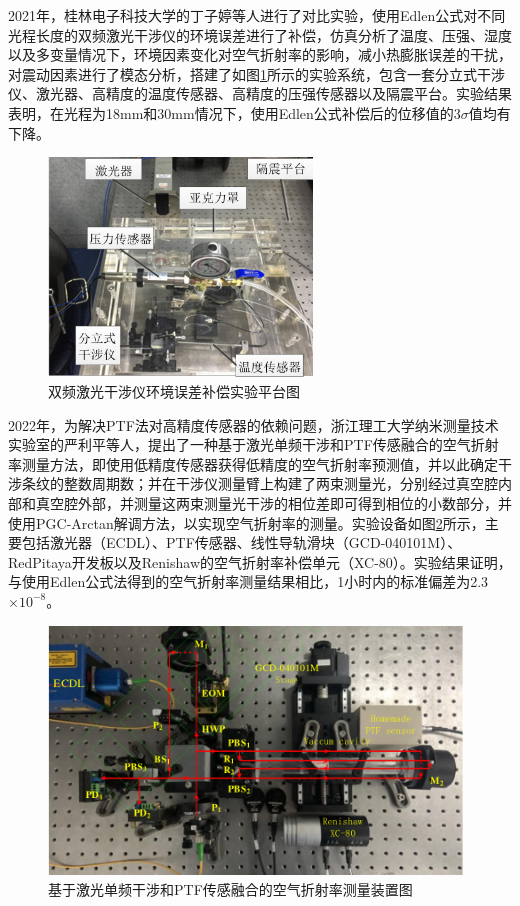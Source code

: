 2021年，桂林电子科技大学的丁子婷等人进行了对比实验，使用Edlen公式对不同光程长度的双频激光干涉仪的环境误差进行了补偿，仿真分析了温度、压强、湿度以及多变量情况下，环境因素变化对空气折射率的影响，减小热膨胀误差的干扰，对震动因素进行了模态分析，搭建了如图\ref{fig:双频激光干涉仪环境误差补偿实验平台图}所示的实验系统\cite{丁子婷双频激光干涉仪测量系统的环境误差研究}，包含一套分立式干涉仪、激光器、高精度的温度传感器、高精度的压强传感器以及隔震平台。实验结果表明，在光程为18mm和30mm情况下，使用Edlen公式补偿后的位移值的3$\sigma$值均有下降。
\begin{figure}[htb]
  \centering
  \includegraphics[width=7cm]{fig/1-fig/双频激光干涉仪环境误差补偿实验平台图.jpg}
  \caption{双频激光干涉仪环境误差补偿实验平台图}
  \label{fig:双频激光干涉仪环境误差补偿实验平台图}
\end{figure}

2022年，为解决PTF法对高精度传感器的依赖问题，浙江理工大学纳米测量技术实验室的严利平等人，提出了一种基于激光单频干涉和PTF传感融合的空气折射率测量方法，即使用低精度传感器获得低精度的空气折射率预测值，并以此确定干涉条纹的整数周期数；并在干涉仪测量臂上构建了两束测量光，分别经过真空腔内部和真空腔外部，并测量这两束测量光干涉的相位差即可得到相位的小数部分，并使用PGC-Arctan解调方法，以实现空气折射率的测量。实验设备如图\ref{fig:基于激光单频干涉和PTF传感融合的空气折射率测量装置图}所示\cite{2022基于激光单频干涉和PTF传感融合的空气折射率测量方法}，主要包括激光器（ECDL）、PTF传感器、线性导轨滑块（GCD-040101M）、RedPitaya开发板以及Renishaw的空气折射率补偿单元（XC-80）。实验结果证明，与使用Edlen公式法得到的空气折射率测量结果相比，1小时内的标准偏差为2.3$\times 10^{-8}$。
\begin{figure}[htb]
  \centering
  \includegraphics[width=11cm]{fig/1-fig/基于激光单频干涉和PTF传感融合的空气折射率测量装置图.png}
  \caption{基于激光单频干涉和PTF传感融合的空气折射率测量装置图}
  \label{fig:基于激光单频干涉和PTF传感融合的空气折射率测量装置图}
\end{figure}


